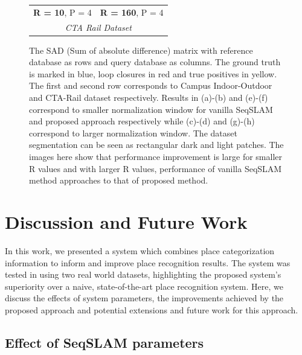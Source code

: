 \documentclass[letterpaper, 10 pt, conference]{ieeeconf}  %
\begin{document}
\begin{figure}[!h]
\begin{tabular*}{\textwidth}[t]{cccc}
  \multicolumn{2}{c}{\textbf{R = 10}, P = 4} & \multicolumn{2}{c}{\textbf{R = 160}, P = 4} \\
  \multicolumn{4}{c}{\emph{CTA Rail Dataset}} \\
 \end{tabular*}
 \caption{The SAD (Sum of absolute difference) matrix with reference database as rows and query database as columns. The ground truth is marked in blue, loop closures in red and true positives in yellow. The first and second row corresponds to Campus Indoor-Outdoor and CTA-Rail dataset respectively. Results in (a)-(b) and (e)-(f) correspond to smaller normalization window for vanilla SeqSLAM and proposed approach respectively while (c)-(d) and (g)-(h) correspond to larger normalization window. The dataset segmentation can be seen as rectangular dark and light patches. The images here show that performance improvement is large for smaller R values and with larger R values, performance of vanilla SeqSLAM method approaches to that of proposed method.}
 \label{fig:sadMat}

\end{figure}


\section{Discussion and Future Work}
In this work, we presented a system which combines place categorization information to inform and improve place recognition results. The system was tested in using two real world datasets, highlighting the proposed system's superiority over a naive, state-of-the-art place recognition system. Here, we discuss the effects of system parameters, the improvements achieved by the proposed approach and potential extensions and future work for this approach. 

\subsection{Effect of SeqSLAM parameters}
\end{document}
